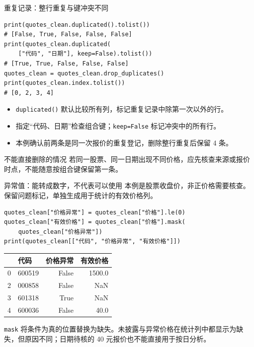 \documentclass[9pt]{ctexbeamer}
\begin{document}
\begin{frame}[fragile]{重复记录：整行重复与键冲突不同}
\begin{lstlisting}
print(quotes_clean.duplicated().tolist())
# [False, True, False, False, False]
print(quotes_clean.duplicated(
    ["代码", "日期"], keep=False).tolist())
# [True, True, False, False, False]
quotes_clean = quotes_clean.drop_duplicates()
print(quotes_clean.index.tolist())
# [0, 2, 3, 4]
\end{lstlisting}
\begin{itemize}
\item \texttt{duplicated()} 默认比较所有列，标记重复记录中除第一次以外的行。
\item 指定“代码、日期”检查组合键；\texttt{keep=False} 标记冲突中的所有行。
\item 本例确认前两条是同一次报价的重复登记，删除整行重复后保留 4 条。
\end{itemize}
\begin{block}{不能直接删除的情况}
若同一股票、同一日期出现不同价格，应先核查来源或报价时点，不能随意按组合键保留第一条。
\end{block}
\end{frame}

\begin{frame}[fragile]{异常值：能转成数字，不代表可以使用}
\small 本例是股票收盘价，非正价格需要核查。保留问题标记，单独生成用于统计的有效价格列。
\begin{lstlisting}
quotes_clean["价格异常"] = quotes_clean["价格"].le(0)
quotes_clean["有效价格"] = quotes_clean["价格"].mask(
    quotes_clean["价格异常"])
print(quotes_clean[["代码", "价格异常", "有效价格"]])
\end{lstlisting}
\begin{center}
\begin{tabular}{rlrr}
\toprule
 & 代码 & 价格异常 & 有效价格 \\
\midrule
0 & 600519 & False & 1500.0 \\
2 & 000858 & False & NaN \\
3 & 601318 & True & NaN \\
4 & 600036 & False & 40.0 \\
\bottomrule
\end{tabular}
\end{center}
\small \texttt{mask} 将条件为真的位置替换为缺失。未披露与异常价格在统计列中都显示为缺失，但原因不同；日期待核的 40 元报价也不能直接用于按日分析。
\end{frame}
\end{document}
